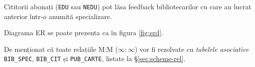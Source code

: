 Cititorii abonați (\texttt{EDU} sau \texttt{NEDU}) pot lăsa feedback
bibliotecarilor cu care au lucrat anterior într-o anumită specializare.

Diagrama ER se poate prezenta ca în figura \ref{fig:erd}.

De menționat că toate relațiile M:M ($\infty : \infty$) vor fi rezolvate
cu \emph{tabelele asociative} \texttt{BIB\_SPEC}, \texttt{BIB\_CIT} și
\texttt{PUB\_CARTE}, listate la \S\ref{sec:scheme-rel}.



\newpage

